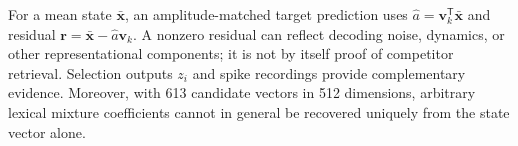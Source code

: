 For a mean state $\bar{\mathbf x}$, an amplitude-matched target prediction uses $\hat a=\mathbf v_k^{\mathsf T}\bar{\mathbf x}$ and residual $\mathbf r=\bar{\mathbf x}-\hat a\mathbf v_k$. A nonzero residual can reflect decoding noise, dynamics, or other representational components; it is not by itself proof of competitor retrieval. Selection outputs $z_i$ and spike recordings provide complementary evidence. Moreover, with 613 candidate vectors in 512 dimensions, arbitrary lexical mixture coefficients cannot in general be recovered uniquely from the state vector alone.
